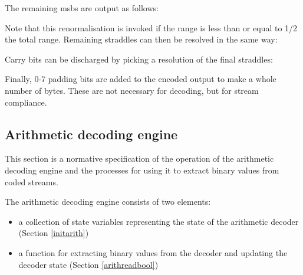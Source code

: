 \begin{informative*}
The remaining msbs are output as follows:

\begin{pseudo*}
        \bsEND
    \bsEND
\bsEND
\end{pseudo*}

Note that this renormalisation is invoked if the range is less than
or equal to 1/2 the total range. Remaining straddles can then
be resolved in the same way:

\begin{pseudo*}
    \bsEND
\bsEND
\end{pseudo*}

Carry bits can be discharged by picking a resolution of
the final straddles:

\begin{pseudo*}
\bsEND
\end{pseudo*}

Finally, 0-7 padding bits are added to the encoded output to make
a whole number of bytes. These are not necessary for decoding, but
for stream compliance.

\end{informative*}
\subsection{Arithmetic decoding engine}
\label{arithengine}

This section is a normative specification of the operation of the arithmetic
decoding engine and the processes for using it to extract binary values from coded streams.

The arithmetic decoding engine consists of two elements: 
\begin{itemize}
\item a collection of state variables representing the state of the arithmetic 
decoder (Section \ref{initarith})
\item a function for extracting binary values from the decoder 
and updating the decoder state (Section \ref{arithreadbool})
\end{itemize}

